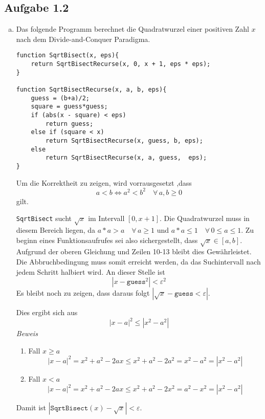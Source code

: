 \documentclass[11pt]{article}
\newcommand{\abs}[1]{\left| #1 \right| }
\begin{document}
\subsection*{Aufgabe 1.2}
\begin{enumerate}[a)]
  \item
    Das folgende Programm berechnet die Quadratwurzel einer positiven
    Zahl $x$ nach dem Divide-and-Conquer Paradigma.


    \begin{lstlisting}
function SqrtBisect(x, eps){
    return SqrtBisectRecurse(x, 0, x + 1, eps * eps);
}

function SqrtBisectRecurse(x, a, b, eps){
    guess = (b+a)/2;
    square = guess*guess;
    if (abs(x - square) < eps)
        return guess;
    else if (square < x)
        return SqrtBisectRecurse(x, guess, b, eps);
    else
        return SqrtBisectRecurse(x, a, guess,  eps);
}
  \end{lstlisting}

  Um die Korrektheit zu zeigen, wird vorrausgesetzt ,dass
  \begin{equation}
    a < b \iff a^2 < b^2 \quad\forall\, a, b \ge 0
  \end{equation}
  gilt.

  \texttt{SqrtBisect} sucht $\sqrt{x}$ im Intervall $[0,x+1]$. Die Quadratwurzel
  muss in diesem Bereich liegen, da $a * a > a \quad\forall\, a \ge 1 $ und
  $a * a \le 1 \quad\forall\, 0 \le a \le 1$.
  Zu beginn eines Funktionsaufrufes sei also sichergestellt, dass $\sqrt{x} \in
  [a,b]$.  Aufgrund der oberen Gleichung und Zeilen 10-13 bleibt dies
  Gew\"ahrleistet. Die Abbruchbedingung muss somit erreicht werden, da das
  Suchintervall nach jedem Schritt halbiert wird. An dieser Stelle ist
  \begin{equation}
  | x - \texttt{guess}^2 | < \varepsilon^2
  \end{equation}
  Es bleibt noch zu zeigen, dass daraus folgt $\left| \sqrt{x} - \texttt{guess}
  < \varepsilon \right|$.

  Dies ergibt sich aus \[ \left| x-a \right|^2 \le \left| x^2 - a^2 \right|  \]
  \emph{Beweis}
  \begin{enumerate}
    \item Fall $x \ge a$
      \[ \abs{x-a}^2 = x^2 + a^2 - 2 ax \le x^2 + a^2 - 2 a^2 = x^2 -a^2 =
      \abs{x^2-a^2}  \]
    \item Fall $x < a$
      \[ \abs{x-a}^2 = x^2 + a^2 - 2 ax \le x^2 + a^2 - 2 x^2 = a^2 -x^2 =
      \abs{x^2-a^2}  \]
  \end{enumerate}
  Damit ist $\abs{ \texttt{SqrtBisect}(x)- \sqrt{x} } < \varepsilon$.


\end{enumerate}
\end{document}
